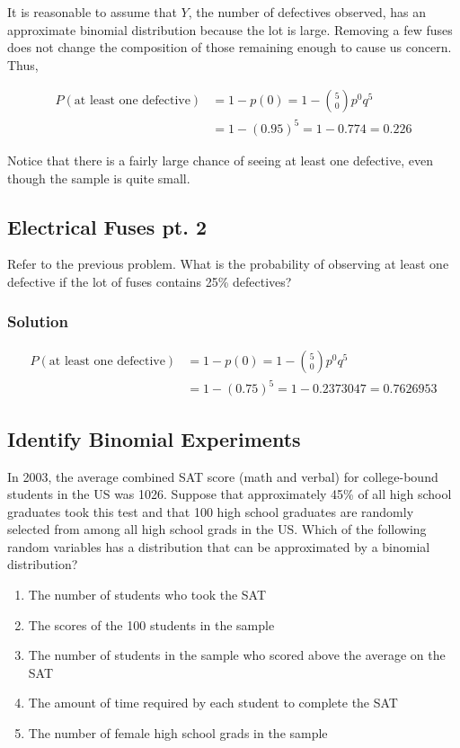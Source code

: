 \documentclass[11pt]{article}
\theoremstyle{definition}
\begin{document}
It is reasonable to assume that $Y$, the number of defectives observed, has an approximate binomial distribution because the lot is large. Removing a few fuses does not change the composition of those remaining enough to cause us concern. Thus,

$$
	\begin{aligned}
		P(\text{at least one defective}) & = 1 - p(0) = 1 - {5 \choose 0} p^0q^5 \\
		& = 1 - (0.95)^5 = 1 - 0.774 = 0.226
	\end{aligned}
$$

Notice that there is a fairly large chance of seeing at least one defective, even though the sample is quite small.

\subsection{Electrical Fuses pt. 2}

Refer to the previous problem. What is the probability of observing at least one defective if the lot of fuses contains 25\% defectives?

\subsubsection*{Solution}

$$
	\begin{aligned}
		P(\text{at least one defective}) & = 1 - p(0) = 1 - {5 \choose 0} p^0q^5 \\
		& = 1 - (0.75)^5 = 1 - 0.2373047 = 0.7626953
	\end{aligned}
$$

\subsection{Identify Binomial Experiments}

In 2003, the average combined SAT score (math and verbal) for college-bound students in the US was 1026. Suppose that approximately 45\% of all high school graduates took this test and that 100 high school graduates are randomly selected from among all high school grads in the US. Which of the following random variables has a distribution that can be approximated by a binomial distribution?

\begin{enumerate}[label=\alph*)]
	\item The number of students who took the SAT
	\item The scores of the 100 students in the sample
	\item The number of students in the sample who scored above the average on the SAT
	\item The amount of time required by each student to complete the SAT
	\item The number of female high school grads in the sample
\end{enumerate}
\end{document}
